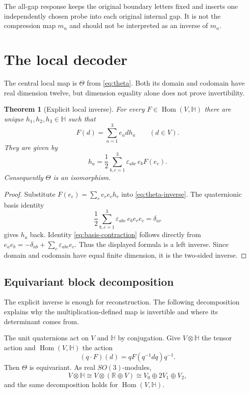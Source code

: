 \documentclass[11pt]{article}
\newtheorem{theorem}{Theorem}[section]
\theoremstyle{definition}
\theoremstyle{remark}
\newcommand{\R}{\mathbb R}
\newcommand{\Hq}{\mathbb H}
\newcommand{\Hom}{\operatorname{Hom}}
\newcommand{\eps}{\varepsilon}
\begin{document}
The all-gap response keeps the original boundary letters fixed and inserts one independently chosen probe into each original internal gap.  It is not the compression map $m_n$ and should not be interpreted as an inverse of $m_n$.

\section{The local decoder}\label{sec:local-decoder}

The central local map is $\Theta$ from \eqref{eq:theta}.  Both its domain and codomain have real dimension twelve, but dimension equality alone does not prove invertibility.

\begin{theorem}[Explicit local inverse]\label{thm:theta-inverse}
For every $F\in\Hom(V,\Hq)$ there are unique $h_1,h_2,h_3\in\Hq$ such that
\[
  F(d)=\sum_{a=1}^3 e_a d h_a\qquad(d\in V).
\]
They are given by
\begin{equation}\label{eq:theta-inverse}
  h_a=\frac12\sum_{b,c=1}^3\eps_{abc}\,e_bF(e_c).
\end{equation}
Consequently $\Theta$ is an isomorphism.
\end{theorem}

\begin{proof}
Substitute $F(e_c)=\sum_r e_r e_c h_r$ into \eqref{eq:theta-inverse}.  The quaternionic basis identity
\begin{equation}\label{eq:basis-contraction}
  \frac12\sum_{b,c=1}^3\eps_{abc}\,e_be_re_c=\delta_{ar}
\end{equation}
gives $h_a$ back.  Identity \eqref{eq:basis-contraction} follows directly from $e_ae_b=-\delta_{ab}+\sum_c\eps_{abc}e_c$.  Thus the displayed formula is a left inverse.  Since domain and codomain have equal finite dimension, it is the two-sided inverse.
\end{proof}

\subsection{Equivariant block decomposition}

The explicit inverse is enough for reconstruction.  The following decomposition explains why the multiplication-defined map is invertible and where its determinant comes from.

The unit quaternions act on $V$ and $\Hq$ by conjugation.  Give $V\otimes\Hq$ the tensor action and $\Hom(V,\Hq)$ the action
\[
  (q\cdot F)(d)=qF(q^{-1}dq)q^{-1}.
\]
Then $\Theta$ is equivariant.  As real $SO(3)$-modules,
\begin{equation}\label{eq:theta-modules}
  V\otimes\Hq
  \cong V\otimes(\R\oplus V)
  \cong V_0\oplus 2V_1\oplus V_2,
\end{equation}
and the same decomposition holds for $\Hom(V,\Hq)$.
\end{document}
